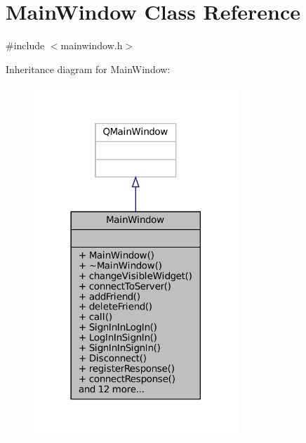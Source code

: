 \hypertarget{classMainWindow}{}\section{Main\+Window Class Reference}
\label{classMainWindow}


{\ttfamily \#include $<$mainwindow.\+h$>$}



Inheritance diagram for Main\+Window\+:
\nopagebreak
\begin{figure}[H]
\begin{center}
\leavevmode
\includegraphics[width=218pt]{classMainWindow__inherit__graph}
\end{center}
\end{figure}


